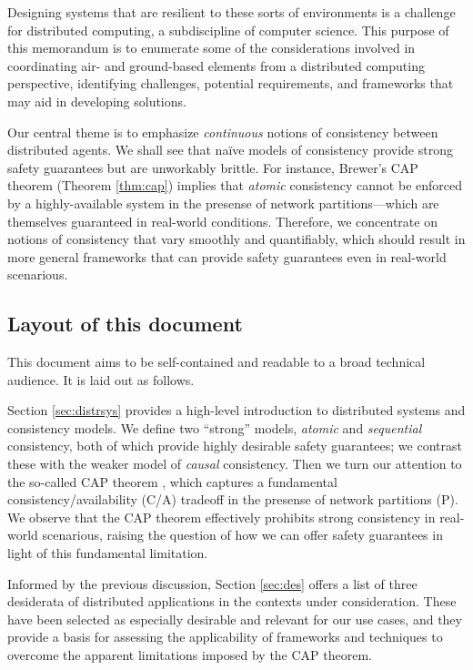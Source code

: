Designing systems that are resilient to these sorts of environments is
a challenge for distributed computing, a subdiscipline of computer
science. This purpose of this memorandum is to enumerate some of the
considerations involved in coordinating air- and ground-based elements
from a distributed computing perspective, identifying challenges,
potential requirements, and frameworks that may aid in developing
solutions.

Our central theme is to emphasize \emph{continuous} notions of
consistency between distributed agents. We shall see that na\"ive
models of consistency provide strong safety guarantees but are
unworkably brittle. For instance, Brewer's CAP theorem (Theorem
\ref{thm:cap}) implies that \emph{atomic} consistency cannot be
enforced by a highly-available system in the presense of network
partitions---which are themselves guaranteed in real-world
conditions. Therefore, we concentrate on notions of consistency that
vary smoothly and quantifiably, which should result in more general
frameworks that can provide safety guarantees even in real-world
scenarious.

\subsection{Layout of this document}

This document aims to be self-contained and readable to a broad
technical audience. It is laid out as follows.

Section \ref{sec:distrsys} provides a high-level introduction to
distributed systems and consistency models. We define two ``strong''
models, \emph{atomic} and \emph{sequential} consistency, both of which
provide highly desirable safety guarantees; we contrast these with the
weaker model of \emph{causal} consistency. Then we turn our attention
to the so-called CAP theorem \cite{2000brewerCAP}
\cite{2002gilbertlynchCAP}, which captures a fundamental
consistency/availability (C/A) tradeoff in the presense of network
partitions (P). We observe that the CAP theorem effectively prohibits
strong consistency in real-world scenarious, raising the question of
how we can offer safety guarantees in light of this fundamental
limitation.

Informed by the previous discussion, Section \ref{sec:des} offers a
list of three desiderata of distributed applications in the contexts
under consideration. These have been selected as especially desirable
and relevant for our use cases, and they provide a basis for assessing
the applicability of frameworks and techniques to overcome the
apparent limitations imposed by the CAP theorem.

